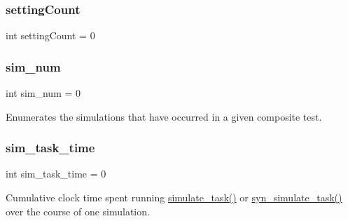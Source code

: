 \subsubsection{\texorpdfstring{settingCount}{settingCount}}
{\footnotesize\ttfamily int setting\+Count = 0\hspace{0.3cm}{\ttfamily [static]}}

\mbox{\label{classdynamicfilterapp_1_1test__simulations_1_1_simulation_test_a85a91fb88baf5a119ab7c5cddf9006ae}} 
\subsubsection{\texorpdfstring{sim\_num}{sim\_num}}
{\footnotesize\ttfamily int sim\+\_\+num = 0\hspace{0.3cm}{\ttfamily [static]}}



Enumerates the simulations that have occurred in a given composite test. 

\mbox{\label{classdynamicfilterapp_1_1test__simulations_1_1_simulation_test_ab7d456049efdc5d9da3fd20938f5aa1c}} 
\subsubsection{\texorpdfstring{sim\_task\_time}{sim\_task\_time}}
{\footnotesize\ttfamily int sim\+\_\+task\+\_\+time = 0\hspace{0.3cm}{\ttfamily [static]}}



Cumulative clock time spent running \mbox{\hyperlink{classdynamicfilterapp_1_1test__simulations_1_1_simulation_test_a8bed8f0f57234f8356ce3bc19606c6bf}{simulate\+\_\+task()}} or \mbox{\hyperlink{classdynamicfilterapp_1_1test__simulations_1_1_simulation_test_adb57a1130669e13cca7754f0a6ea040f}{syn\+\_\+simulate\+\_\+task()}} over the course of one simulation. 

\mbox{\label{classdynamicfilterapp_1_1test__simulations_1_1_simulation_test_a0cb38299204269a784337186882a99e3}} 
